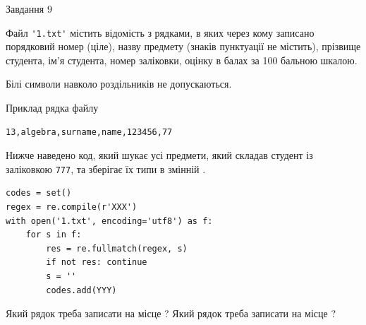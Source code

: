 \documentclass[12pt, ukrainian]{article}
\def\code#1{\Verb!#1!}
\begin{document}
{\begin{minipage}[t]{8.0cm}
\end{minipage}

               
{\begin{center}Завдання {9}\end{center}}
\vspace{-4mm}
Файл \code{'1.txt'} містить відомість з рядками, в яких через кому записано поряд\-ковий номер (ціле), назву предмету (знаків пунктуації не містить), прізвище студента, ім'я студента, номер заліковки, оцінку в балах за 100 бальною шкалою.

Білі символи навколо роздільників не допускаються.

Приклад рядка файлу



\begin{verbatim}
13,algebra,surname,name,123456,77
\end{verbatim}


Нижче наведено код, який шукає усі предмети, який складав студент із заліковкою \code{777}, та зберігає їх типи в змінній .



\begin{verbatim}
codes = set()
regex = re.compile(r'XXX')
with open('1.txt', encoding='utf8') as f:
    for s in f:
        res = re.fullmatch(regex, s)
        if not res: continue
        s = ''
        codes.add(YYY)
\end{verbatim}



Який рядок треба записати на місце  ?
Який рядок треба записати на місце  ?\par

}
\newpage
\end{document}
